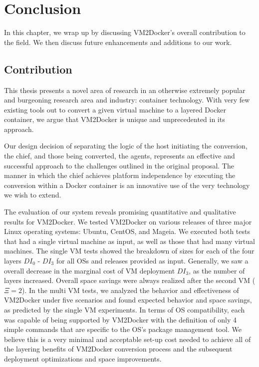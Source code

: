 \chapter{Conclusion}
\label{chap:conclusion}
In this chapter, we wrap up by discussing VM2Docker's overall contribution to the field. We then discuss future enhancements and additions to our work.

\section{Contribution}
This thesis presents a novel area of research in an otherwise extremely popular and burgeoning research area and industry: container technology. With very few existing tools out to convert a given virtual machine to a layered Docker container, we argue that VM2Docker is unique and unprecedented in its approach. 

Our design decision of separating the logic of the host initiating the conversion, the chief, and those being converted, the agents, represents an effective and successful approach to the challenges outlined in the original proposal. The manner in which the chief achieves platform independence by executing the conversion within a Docker container is an innovative use of the very technology we wish to extend.

The evaluation of our system reveals promising quantitative and qualitative results for VM2Docker. We tested VM2Docker on various releases of three major Linux operating systems: Ubuntu, CentOS, and Mageia. We executed both tests that had a single virtual machine as input, as well as those that had many virtual machines. The single VM tests showed the breakdown of sizes for each of the four layers $DI_0$ - $DI_3$ for all OSs and releases provided as input. Generally, we saw a overall decrease in the marginal cost of VM deployment $DI_3$, as the number of layers increased. Overall space savings were always realized after the second VM ($\Xi = 2$). In the multi VM tests, we analyzed the behavior and effectiveness of VM2Docker under five scenarios and found expected behavior and space savings, as predicted by the single VM experiments. In terms of OS compatibility, each was capable of being supported by VM2Docker with the definition of only 4 simple commands that are specific to the OS's package management tool. We believe this is a very minimal and acceptable set-up cost needed to achieve all of the layering benefits of VM2Docker conversion process and the subsequent deployment optimizations and space improvements.

